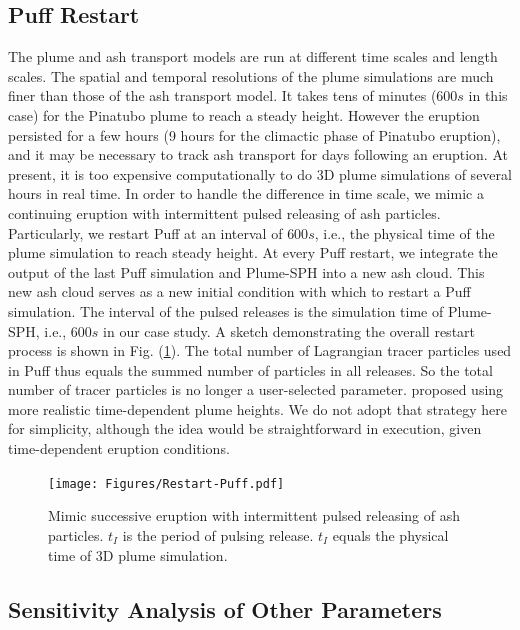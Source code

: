 \documentclass[draft,linenumbers]{agujournal2019}
\begin{document}
\subsection{Puff Restart}

The plume and ash transport models are run at different time scales and length scales. The spatial and temporal resolutions of the plume simulations are much finer than those of the ash transport model. It takes tens of minutes ($600 s$ in this case) for the Pinatubo plume to reach a steady height. However the eruption persisted for a few hours (9 hours for the climactic phase of Pinatubo eruption), and it may be necessary to track ash transport for days following an eruption. At present, it is too expensive computationally to do 3D plume simulations of several hours in real time. In order to handle the difference in time scale, we mimic a continuing eruption with intermittent pulsed releasing of ash particles. Particularly, we restart Puff at an interval of $600 s$, i.e., the physical time of the plume simulation to reach steady height. At every Puff restart, we integrate the output of the last Puff simulation and Plume-SPH into a new ash cloud. This new ash cloud serves as a new initial condition with which to restart a Puff simulation. The interval of the pulsed releases is the simulation time of Plume-SPH, i.e., $600 s$ in our case study. A sketch demonstrating the overall restart process is shown in Fig. (\ref{fig:Restart-Puff}). The total number of Lagrangian tracer particles used in Puff thus equals the summed number of particles in all releases. So the total number of tracer particles is no longer a user-selected parameter.
\citet{fero2008simulation} proposed using more realistic time-dependent plume heights. We do not adopt that strategy here for simplicity, although the idea would be straightforward in execution, given time-dependent eruption conditions.

\begin{figure}
\center
\texttt{[image: Figures/Restart-Puff.pdf]}
\caption{Mimic successive eruption with intermittent pulsed releasing of ash particles. $t_I$ is the period of pulsing release. $t_I$ equals the physical time of 3D plume simulation.}
\label{fig:Restart-Puff}
\end{figure}

\subsection{Sensitivity Analysis of Other Parameters}
\end{document}
